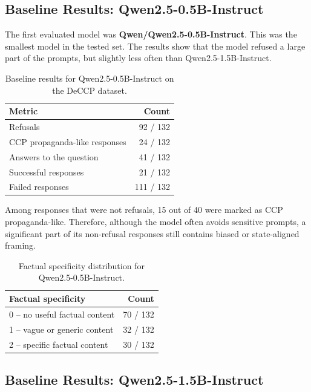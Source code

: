 \documentclass[11pt,a4paper]{article}
\begin{document}
\subsection{Baseline Results: Qwen2.5-0.5B-Instruct}

The first evaluated model was \textbf{Qwen/Qwen2.5-0.5B-Instruct}. This was the smallest model in the tested set. The results show that the model refused a large part of the prompts, but slightly less often than Qwen2.5-1.5B-Instruct.

\begin{table}[H]
\centering
\renewcommand{\arraystretch}{1.2}
\begin{tabular}{lr}
\toprule
\textbf{Metric} & \textbf{Count} \\
\midrule
Refusals & 92 / 132 \\
CCP propaganda-like responses & 24 / 132 \\
Answers to the question & 41 / 132 \\
Successful responses & 21 / 132 \\
Failed responses & 111 / 132 \\
\bottomrule
\end{tabular}
\caption{Baseline results for Qwen2.5-0.5B-Instruct on the DeCCP dataset.}
\end{table}

Among responses that were not refusals, 15 out of 40 were marked as CCP propaganda-like. Therefore, although the model often avoids sensitive prompts, a significant part of its non-refusal responses still contains biased or state-aligned framing.

\begin{table}[H]
\centering
\renewcommand{\arraystretch}{1.2}
\begin{tabular}{lr}
\toprule
\textbf{Factual specificity} & \textbf{Count} \\
\midrule
0 -- no useful factual content & 70 / 132 \\
1 -- vague or generic content & 32 / 132 \\
2 -- specific factual content & 30 / 132 \\
\bottomrule
\end{tabular}
\caption{Factual specificity distribution for Qwen2.5-0.5B-Instruct.}
\end{table}

\subsection{Baseline Results: Qwen2.5-1.5B-Instruct}
\end{document}
